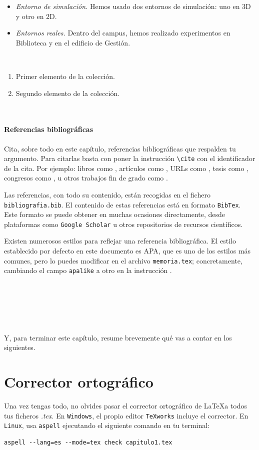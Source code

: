 			\begin{itemize}
				\item \textit{Entorno de simulación.} Hemos usado dos entornos de simulación: uno en 3D y otro en 2D.
				\item \textit{Entornos reales.} Dentro del campus, hemos realizado experimentos en Biblioteca y en el edificio de Gestión.
			\end{itemize}\
			
			\begin{enumerate}
				\item Primer elemento de la colección.
				\item Segundo elemento de la colección.
			\end{enumerate}\
			
			\paragraph{Referencias bibliográficas}
			\label{sec:referencias}
			
			Cita, sobre todo en este capítulo, referencias bibliográficas que respalden tu argumento. Para citarlas basta con poner la instrucción \verb|\cite| con el identificador de la cita. Por ejemplo: libros como \cite{vega12e}, artículos como \cite{vega19b}, URLs como \cite{vega19a}, tesis como \cite{vega18b}, congresos como \cite{vega18a}, u otros trabajos fin de grado como \cite{vega08b}.
			
			Las referencias, con todo su contenido, están recogidas en el fichero \texttt{bibliografia.bib}. El contenido de estas referencias está en formato \texttt{BibTex}. Este formato se puede obtener en muchas ocasiones directamente, desde plataformas como \texttt{Google Scholar} u otros repositorios de recursos científicos.
			
			Existen numerosos estilos para reflejar una referencia bibliográfica. El estilo establecido por defecto en este documento es APA, que es uno de los estilos más comunes, pero lo puedes modificar en el archivo \texttt{memoria.tex}; concretamente, cambiando el campo \verb|apalike| a otro en la instrucción \verb||. 
			
			\
			
			\
			
			\
			
			Y, para terminar este capítulo, resume brevemente qué vas a contar en los siguientes.


\section{Corrector ortográfico}

Una vez tengas todo, no olvides pasar el corrector ortográfico de \LaTeX a todos tus ficheros \textit{.tex}. En \texttt{Windows}, el propio editor \texttt{TeXworks} incluye el corrector. En \texttt{Linux}, usa \texttt{aspell} ejecutando el siguiente comando en tu terminal:

\begin{verbatim}
aspell --lang=es --mode=tex check capitulo1.tex
\end{verbatim}
